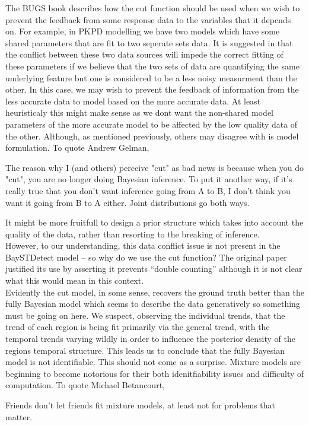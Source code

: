 \documentclass[11pt]{report}
\begin{document}
The BUGS book describes how the cut function should be used when we wish to prevent the feedback from some response data to the variables that it depends on. For example, in PKPD modelling we have two models which have some shared parameters that are fit to two seperate sets data. It is suggested in \citet{lunn} that the conflict between these two data sources will impede the correct fitting of these parameters if we believe that the two sets of data are quantifying the same underlying feature but one is considered to be a less noisy measurment than the other. In this case, we may wish to prevent the feedback of information from the less accurate data to model based on the more accurate data. At least heuristicaly this might make sense as we dont want the non-shared model parameters of the more accurate model to be affected by the low quality data of the other. Although, as mentioned previously, others may disagree with is model formulation. To quote Andrew Gelman,
\begin{displayquote}
The reason why I (and others) perceive "cut" as bad news is because when you do "cut",  you are no longer doing Bayesian inference.  To put it another way, if it's really true that you don't want inference going from A to B, I don't think you want it going from B to A either.  Joint distributions go both ways.     
\end{displayquote}
It might be more fruitfull to design a prior structure which takes into account the quality of the data, rather than resorting to the breaking of inference. \\

However, to our understanding, this data conflict issue is not present in the BaySTDetect model -- so why do we use the cut function? The original paper \citep{baystdetect} justified its use by asserting it prevents ``double counting'' although it is not clear what this would mean in this context. \\

Evidently the cut model, in some sense, recovers the ground truth better than the fully Bayesian model which seems to describe the data generatively so something must be going on here. We suspect, observing the individual trends, that the trend of each region is being fit primarily via the general trend, with the temporal trends varying wildly in order to influence the posterior density of the regions temporal structure. This leads us to conclude that the fully Bayesian model is not identifiable. This should not come as a surprise. Mixture models are beginning to become notorious for their both idenitfiability issues and difficulty of computation. To quote Michael Betancourt,
\begin{displayquote}
Friends don't let friends fit mixture models, at least not for problems that matter.
\end{displayquote}
\end{document}
